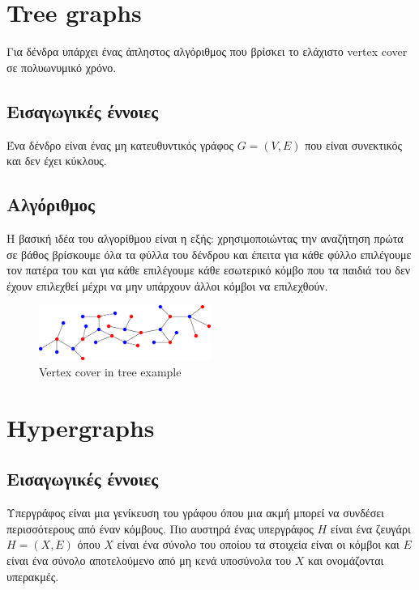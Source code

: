 \section{Tree graphs}
Για δένδρα υπάρχει ένας άπληστος αλγόριθμος που βρίσκει το ελάχιστο vertex cover σε πολυωνυμικό χρόνο.

\subsection{Εισαγωγικές έννοιες}
Ένα δένδρο είναι ένας μη κατευθυντικός γράφος $G=(V,E)$ που είναι συνεκτικός και δεν έχει κύκλους.

\subsection{Αλγόριθμος}
Η βασική ιδέα του αλγορίθμου είναι η εξής: χρησιμοποιώντας την αναζήτηση πρώτα σε βάθος βρίσκουμε όλα τα φύλλα του δένδρου και έπειτα για κάθε φύλλο επιλέγουμε τον πατέρα του και για κάθε επιλέγουμε κάθε εσωτερικό κόμβο που τα παιδιά του δεν έχουν επιλεχθεί μέχρι να μην υπάρχουν άλλοι κόμβοι να επιλεχθούν.

\begin{figure}[H]
\caption{Vertex cover in tree example}
\centering
\includegraphics[width=0.5\textwidth]{Figures/vc_tree.png}\centering
\end{figure}


\section{Hypergraphs}
\subsection{Εισαγωγικές έννοιες}
Υπεργράφος είναι μια γενίκευση του γράφου όπου μια ακμή μπορεί να συνδέσει περισσότερους από έναν κόμβους. Πιο αυστηρά ένας υπεργράφος $H$ είναι ένα ζευγάρι $H=(X,E)$ όπου $X$ είναι ένα σύνολο του οποίου τα στοιχεία είναι οι κόμβοι και $E$ είναι ένα σύνολο αποτελούμενο από μη κενά υποσύνολα του $X$ και ονομάζονται υπερακμές. 

